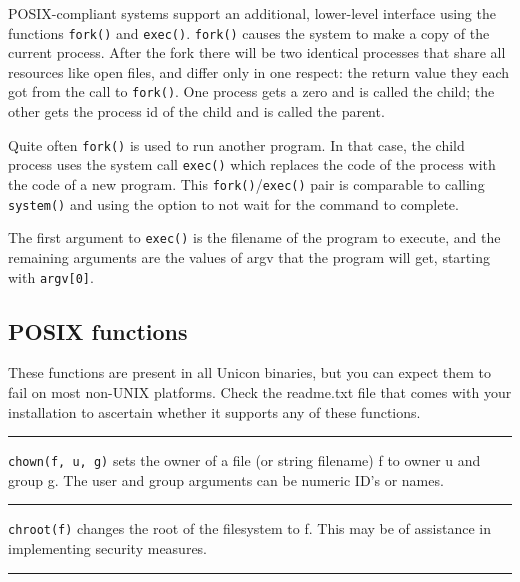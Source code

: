 POSIX-compliant systems support an additional, lower-level interface
using the functions \texttt{fork()} and \texttt{exec()}.
\texttt{fork()} causes the system to make a copy of the current
process. After the fork there will be two identical processes that
share all resources like open files, and differ only in one respect:
the return value they each got from the call to \texttt{fork()}. One
process gets a zero and is called the child; the other gets the
process id of the child and is called the parent.

Quite often \texttt{fork()} is used to run another program. In that
case, the child process uses the system call \texttt{exec()} which
replaces the code of the process with the code of a new program. This
\texttt{fork()}/\texttt{exec()} pair is comparable to calling
\texttt{system()} and using the option to not wait for the command to
complete.

The first argument to \texttt{exec()} is the filename of the program
to execute, and the remaining arguments are the values of argv that
the program will get, starting with \texttt{argv[0]}.


\subsection{POSIX functions}

These functions are present in all Unicon binaries, but you can expect them to
fail on most non-UNIX platforms. Check the readme.txt file that comes with
your installation to ascertain whether it supports any of these functions.

\bigskip\hrule\vspace{0.1cm}

\noindent
\texttt{chown(f, u, g)} sets the owner of a file (or string filename) f to
owner u and group g. The user and group arguments can be numeric
ID's or names.

\bigskip\hrule\vspace{0.1cm}

\noindent
\texttt{chroot(f)} changes the root of the filesystem to f. This may be of
assistance in implementing security measures.

\bigskip\hrule\vspace{0.1cm}

